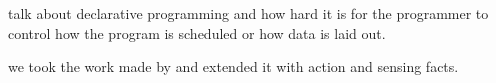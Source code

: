 talk about declarative programming and how hard it is for the programmer to
control how the program is scheduled or how data is laid out.

we took the work made by \cite{cruz-iclp14} and extended it with action and
sensing facts.
